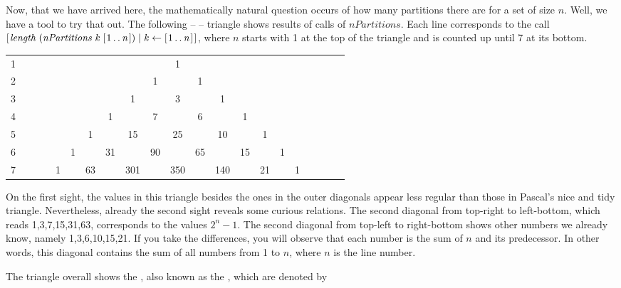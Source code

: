\documentclass{scrreprt}
\newcommand{\Varid}[1]{\mathit{#1}}
\begin{document}
Now, that we have arrived here,
the mathematically natural question occurs
of how many partitions there are for a set of size $n$.
Well, we have a tool to try that out.
The following --  -- triangle 
shows results of calls of \ensuremath{\Varid{nPartitions}}.
Each line corresponds to the call 
\ensuremath{[\mskip1.5mu \Varid{length}\;(\Varid{nPartitions}\;\Varid{k}\;[\mskip1.5mu \mathrm{1}\mathinner{\ldotp\ldotp}\Varid{n}\mskip1.5mu])\mid \Varid{k}\leftarrow [\mskip1.5mu \mathrm{1}\mathinner{\ldotp\ldotp}\Varid{n}\mskip1.5mu]\mskip1.5mu]},
where $n$ starts with 1 at the top of the triangle
and is counted up until 7 at its bottom.

\begin{tabular}{l c c c c c c c c c c c c c c c c c c c c}
1 &   &   &   &   &    &    &    &     &     &   1 &     &     &    &    &    &   &   &   &   &  \\
2 &   &   &   &   &    &    &    &     &   1 &     &   1 &     &    &    &    &   &   &   &   &  \\
3 &   &   &   &   &    &    &    &   1 &     &   3 &     &   1 &    &    &    &   &   &   &   &  \\
4 &   &   &   &   &    &    &  1 &     &   7 &     &   6 &     &  1 &    &    &   &   &   &   &  \\
5 &   &   &   &   &    &  1 &    &  15 &     &  25 &     &  10 &    &  1 &    &   &   &   &   &  \\
6 &   &   &   &   &  1 &    & 31 &     &  90 &     &  65 &     & 15 &    &  1 &   &   &   &   &  \\   
7 &   &   &   & 1 &    & 63 &    & 301 &     & 350 &     & 140 &    & 21 &    & 1 &   &   &   &  
\end{tabular}

On the first sight, the values in this triangle
besides the ones in the outer diagonals appear less regular
than those in Pascal's nice and tidy triangle.
Nevertheless, already the second sight reveals some curious relations.
The second diagonal from top-right to left-bottom,
which reads 1,3,7,15,31,63, corresponds to the values $2^n-1$.
The second diagonal from top-left to right-bottom 
shows other numbers we already know, namely 1,3,6,10,15,21.
If you take the differences, you will observe that each
number is the sum of $n$ and its predecessor.
In other words, this diagonal contains the sum of all numbers
from 1 to $n$, where $n$ is the line number.

The triangle overall shows the ,
also known as the ,
which are denoted by
\end{document}
